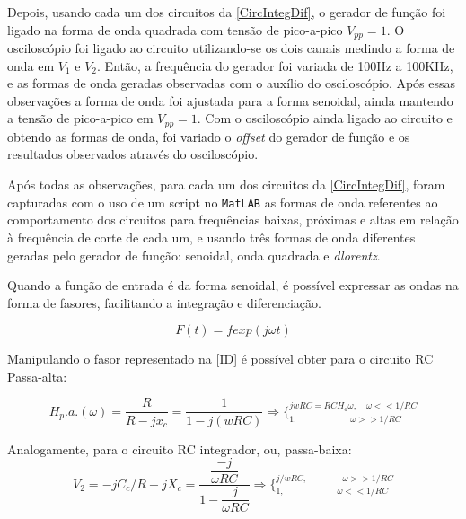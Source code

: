 \documentclass[11pt,a4paper]{article}
\begin{document}
    Depois, usando cada um dos circuitos da \cref{CircIntegDif}, o gerador de função foi ligado na forma de onda quadrada com tensão de pico-a-pico $V_{pp}=1$.
    O osciloscópio foi ligado ao circuito utilizando-se os dois canais medindo a forma de onda em $V_1$ e $V_2$.
    Então, a frequência do gerador foi variada de 100Hz a 100KHz, e as formas de onda geradas observadas com o auxílio do osciloscópio.
    Após essas observações a forma de onda foi ajustada para a forma senoidal, ainda mantendo a tensão de pico-a-pico em $V_{pp}=1$. Com o osciloscópio ainda ligado ao circuito e obtendo as formas de onda, foi variado o \textit{offset} do gerador de função e os resultados observados através do osciloscópio.
    
    Após todas as observações, para cada um dos circuitos da \cref{CircIntegDif}, foram capturadas com o uso de um script no \texttt{MatLAB} as formas de onda referentes ao comportamento dos circuitos para frequências baixas, próximas e altas em relação à frequência de corte de cada um, e usando três formas de onda diferentes geradas pelo gerador de função: senoidal, onda quadrada e \textit{dlorentz}.
    
    Quando a função de entrada é da forma senoidal, é possível expressar as ondas na forma de fasores, facilitando a integração e diferenciação.
    
    \begin{equation}
        F(t) = f exp(j\omega t)
    \label{ID}
    \end{equation}
    
    Manipulando o fasor representado na \cref{ID} é possível obter para o circuito RC Passa-alta:
    
    \begin{equation}
        H_{p}.a.\left( \omega \right) =\dfrac {R}{R-jx_{c}}=\dfrac {1}{1-j\left( wRC\right) }\Rightarrow \{ ^{jwRC=RCH_{d}\omega,\quad \omega << 1/RC}_{1,\qquad \qquad \qquad \omega >> 1/RC}
        \label{PA}
    \end{equation}
    
    Analogamente, para o circuito RC integrador, ou, passa-baixa:
    \begin{equation}
        V_2=-jC_c/R-jX_c= \dfrac{\dfrac{-j}{\omega RC}}{1-\dfrac{j}{\omega RC}}\Rightarrow \{ ^{j/wRC,\qquad \qquad \omega >> 1/RC}_{1,\qquad \qquad \qquad \omega << 1/RC}
        \label{PB}
    \end{equation}
    
\end{document}
